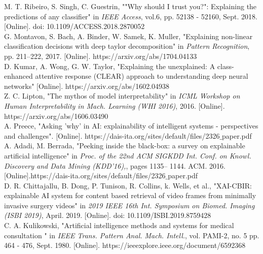 \documentclass[12]{article}
\begin{document}
\begin{thebibliography}{1}
   M. T. Ribeiro, S. Singh, C. Guestrin, ""Why should I trust you?": Explaining the predictions of any classifier" in \textit{IEEE Access}, vol.6,  pp. 52138 - 52160, Sept. 2018. [Online]. doi: 10.1109/ACCESS.2018.2870052\\
  
     G. Montavon, S. Bach, A. Binder, W. Samek, K. Muller, "Explaining non-linear classification decisions with deep taylor decomposition" in \textit{Pattern
Recognition},  pp. 211–222, 2017. [Online]. https://arxiv.org/abs/1704.04133\\

     D. Kumar, A. Wong, G. W.  Taylor, "Explaining the unexplained: A class-enhanced attentive response (CLEAR) approach to understanding deep neural networks"  [Online]. https://arxiv.org/abs/1602.04938\\
    
         Z. C. Lipton, "The mythos of model interpretability" in \textit{ICML Workshop on Human Interpretability in Mach. Learning (WHI 2016)}, 2016. [Online]. https://arxiv.org/abs/1606.03490\\

     A. Preece, "Asking 'why' in AI: explainability of intelligent systems - perspectives and challenges". [Online]. https://dais-ita.org/sites/default/files/2326$\_$paper.pdf\\

   A. Adadi, M. Berrada, "Peeking inside the black-box: a survey on explainable artificial intelligence" in \textit{Proc. of the 22nd ACM SIGKDD Int. Conf. on Knowl. Discovery and Data Mining (KDD’16),}, pages 1135–
1144. ACM. 2016. [Online].https://dais-ita.org/sites/default/files/2326$\_$paper.pdf\\
  
     D. R. Chittajallu, B. Dong, P. Tunison, R. Collins, k. Wells, et al., "XAI-CBIR: explainable AI system for content based retrieval of video frames from minimally invasive surgery videos" in \textit{2019 IEEE 16th Int. Symposium on Biomed. Imaging (ISBI 2019)}, April. 2019. [Online]. doi: 10.1109/ISBI.2019.8759428\\
  
  
     C. A. Kulikowski, "Artificial intelligence methods and systems
for medical consultation " in \textit{IEEE Trans. Pattern Anal.  Mach. Intell.}, vol. PAMI-2, no. 5 pp. 464 - 476, Sept. 1980. [Online]. https://ieeexplore.ieee.org/document/6592368\\
  

\end{thebibliography}
\end{document}
